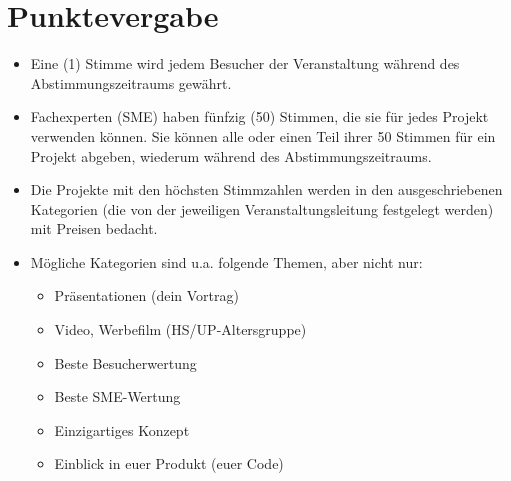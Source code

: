 \documentclass[a4paper,12pt]{article}
\begin{document}
\section{Punktevergabe}
\renewcommand{\labelitemi}{$\star$}
\renewcommand{\labelitemii}{$\checkmark$}
\begin{itemize}
	\item Eine (1) Stimme wird jedem Besucher der Veranstaltung während des
		Abstimmungszeitraums gewährt.
	\item Fachexperten (SME) haben fünfzig (50) Stimmen, die sie für jedes
		Projekt verwenden können. Sie können alle oder einen Teil ihrer
		50 Stimmen für ein Projekt abgeben, wiederum während des
		Abstimmungszeitraums.
	\item Die Projekte mit den höchsten Stimmzahlen werden in den
		ausgeschriebenen Kategorien (die von der jeweiligen
		Veranstaltungsleitung festgelegt werden) mit Preisen bedacht.
	\item Mögliche Kategorien sind u.a. folgende Themen, aber nicht nur:
	\begin{itemize}
		\item Präsentationen (dein Vortrag)
		\item Video, Werbefilm (HS/UP-Altersgruppe)
		\item Beste Besucherwertung
		\item Beste SME-Wertung
		\item Einzigartiges Konzept
		\item Einblick in euer Produkt (euer Code)
	\end{itemize}
\end{itemize}
\end{document}
